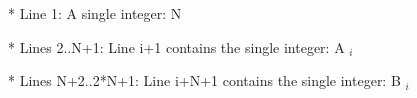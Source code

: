 * Line 1: A single integer: N  

   * Lines 2..N+1: Line i+1 contains the single integer: A   $_    i   $

   * Lines N+2..2*N+1: Line i+N+1 contains the single integer: B   $_    i   $

\